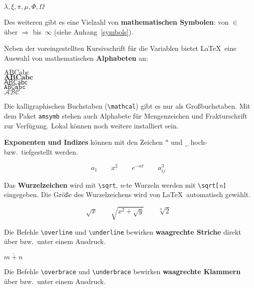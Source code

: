 \begin{LTXexample}
$\lambda, \xi, \pi, \mu,
 \Phi, \Omega $
\end{LTXexample}

 
Des weiteren gibt es eine Vielzahl von \textbf{mathematischen Symbolen}:
von $\in$ über $\Rightarrow$ bis~$\infty$ (siehe
Anhang~\vref{symbols}).
 
\bigskip

Neben der voreingestellten Kursivschrift für die Variablen
bietet \LaTeX\ eine Auswahl von mathematischen \textbf{Alphabeten} an:
\begin{LTXexample}
$\mathrm{ABCabc}$ \\
$\mathbf{ABCabc}$ \\
$\mathsf{ABCabc}$ \\
$\mathtt{ABCabc}$ \\
$\mathcal{ABC}$
\end{LTXexample}

Die kalligraphischen Buchstaben (\lstinline:\mathcal:) gibt es nur als
Großbuchstaben. Mit dem Paket \texttt{amsymb} \cite{ch8} stehen
auch Alphabete für Mengenzeichen und Frakturschrift zur Verfügung.
Lokal können noch weitere installiert sein.


\bigskip

\textbf{Exponenten und Indizes} können mit den Zeichen \lstinline|^|
und \lstinline|_| hoch- bzw.\ tiefgestellt werden.

\begin{LTXexample}
\[
a_{1} \qquad x^{2} \qquad
 e^{-\alpha t} \qquad a^{3}_{ij}
\]
\end{LTXexample}

 
Das \textbf{Wurzelzeichen} wird mit \lstinline|\sqrt|, \textit{n}-te
Wurzeln werden mit \lstinline|\sqrt[|\textit{n}\lstinline|]| eingegeben.
Die Größe des Wurzelzeichens wird von \LaTeX\ automatisch
gewählt.

\begin{LTXexample}
\[
\sqrt{x} \qquad  \sqrt{ x^{2}+\sqrt{y} }
   \qquad \sqrt[3]{2}
\]
\end{LTXexample}
 
Die Befehle \lstinline|\overline| und \lstinline|\underline| bewirken
\textbf{waagrechte Striche} direkt über bzw.\ unter einem
Ausdruck.
\begin{LTXexample}
$\overline{m+n}$
\end{LTXexample}
 
Die Befehle \lstinline|\overbrace| und \lstinline|\underbrace| bewirken
\textbf{waagrechte Klammern} über bzw.\ unter einem Ausdruck.

